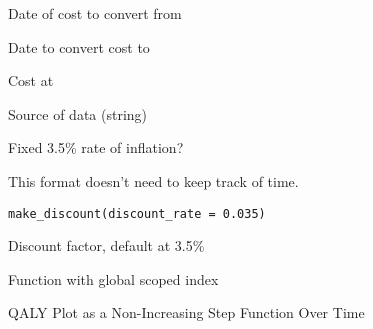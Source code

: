 \documentclass[a4paper]{book}
\begin{document}
%
\begin{Arguments}
\begin{ldescription}
\item[\code{from\_year}] Date of cost to convert from

\item[\code{to\_year}] Date to convert cost to

\item[\code{from\_cost}] Cost at 

\item[\code{reference}] Source of data (string)

\item[\code{fixed}] Fixed 3.5\% rate of inflation?
\end{ldescription}
\end{Arguments}
%
\begin{Examples}
\end{Examples}
%
\begin{Description}\relax
This format doesn't need to keep track of time.
\end{Description}
%
\begin{Usage}
\begin{verbatim}
make_discount(discount_rate = 0.035)
\end{verbatim}
\end{Usage}
%
\begin{Arguments}
\begin{ldescription}
\item[\code{discount\_rate}] Discount factor, default at 3.5\%
\end{ldescription}
\end{Arguments}
%
\begin{Value}
Function with global scoped index
\end{Value}
%
\begin{Description}\relax
QALY Plot as a Non-Increasing Step Function Over Time
\end{Description}
\end{document}
